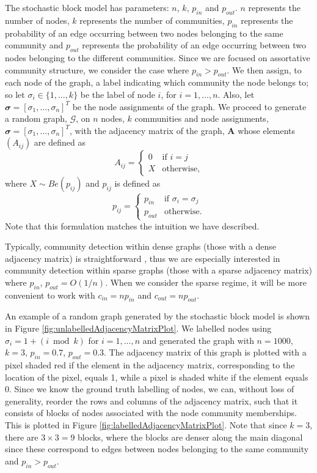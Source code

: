 \documentclass[12pt]{article}
\numberwithin{equation}{section}
\begin{document}
The stochastic block model has parameters: $n$, $k$, $p_{in}$ and $p_{out}$. $n$ represents the number of nodes, $k$ represents the number of communities, $p_{in}$ represents the probability of an edge occurring between two nodes belonging to the same community and $p_{out}$ represents the probability of an edge occurring between two nodes belonging to the different communities. Since we are focused on assortative community structure, we consider the case where $p_{in} > p_{out}$. We then assign, to each node of the graph, a label indicating which community the node belongs to; so let $\sigma_{i} \in \{1,\dots,k\}$ be the label of node $i$, for $i = 1,\dots,n$. Also, let $\mathbfit{\sigma} = [\sigma_{1},\dots,\sigma_{n}]^{T}$ be the node assignments of the graph. We proceed to generate a random graph, $\mathcal{G}$, on $n$ nodes, $k$ communities and node assignments, $\mathbfit{\sigma} = [\sigma_{1},\dots,\sigma_{n}]^{T}$, with the adjacency matrix of the graph, $\mathbf{A}$ whose elements $(A_{ij})$ are defined as
\begin{equation*}
	A_{ij} =
	\begin{cases}
		0 & \text{if } i = j\\
		X & \text{otherwise},
	\end{cases}
\end{equation*}
where $X \sim Be(p_{ij})$ and {$p_{ij}$} is defined as
\begin{equation*}
	p_{ij} =
	\begin{cases}
		p_{in} & \text{if } \sigma_{i} = \sigma_{j}\\
		p_{out} & \text{otherwise}.
	\end{cases}
\end{equation*}
Note that this formulation matches the intuition we have described.

Typically, community detection within dense graphs (those with a dense adjacency matrix) is straightforward \cite{DKM+13}, thus we are especially interested in community detection within sparse graphs (those with a sparse adjacency matrix) where $p_{in}$, $p_{out} = O(1/n)$. When we consider the sparse regime, it will be more convenient to work with $c_{in} = np_{in}$ and $c_{out} = np_{out}$.

An example of a random graph generated by the stochastic block model is shown in Figure \ref{fig:unlabelledAdjacencyMatrixPlot}. We labelled nodes using $\sigma_{i} = 1 + (i \bmod{k})$ for $i = 1,\dots,n$ and generated the graph with $n = 1000$, $k = 3$, $p_{in} = 0.7$, $p_{out} = 0.3$. The adjacency matrix of this graph is plotted with a pixel shaded red if the element in the adjacency matrix, corresponding to the location of the pixel, equals 1, while a pixel is shaded white if the element equals 0. Since we know the ground truth labelling of nodes, we can, without loss of generality, reorder the rows and columns of the adjacency matrix, such that it consists of blocks of nodes associated with the node community memberships. This is plotted in Figure \ref{fig:labelledAdjacencyMatrixPlot}. Note that since $k = 3$, there are $3 \times 3 = 9$ blocks, where the blocks are denser along the main diagonal since these correspond to edges between nodes belonging to the same community and $p_{in} > p_{out}$.
\end{document}
